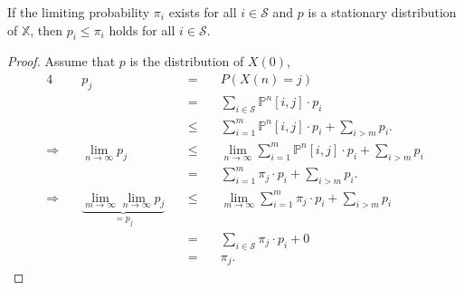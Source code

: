 \begin{inequality} \label{ineq:p-le-pi}
If the limiting probability $ \pi_{i} $ exists for all $ i \in \mathcal{S} $ and $ p $ is a stationary distribution of $ \mathbb{X} $, then $ p_{i} \le \pi_{i} $ holds for all $ i \in \mathcal{S} $.

\begin{proof}
Assume that $ p $ is the distribution of $ X(0) $,
\begin{alignat*}{4}
  & p_{j}
    & \quad=\quad & P(X(n) = j) \\
  & & \quad=\quad & \sum_{i \in \mathcal{S}} \mathbb{P}^{n}[i, j] \cdot p_{i} \\
  & & \quad\le\quad & \sum_{i = 1}^{m} \mathbb{P}^{n}[i, j] \cdot p_{i} + \sum_{i > m} p_{i}. \\
\Rightarrow\quad
  & \lim_{n \to \infty} p_{j}
    & \quad\le\quad & \lim_{n \to \infty} \sum_{i = 1}^{m} \mathbb{P}^{n}[i, j] \cdot p_{i} + \sum_{i > m} p_{i} \\
  & & \quad=\quad & \sum_{i = 1}^{m} \pi_{j} \cdot p_{i} + \sum_{i > m} p_{i}. \\
\Rightarrow\quad
  & \underbrace{\lim_{m \to \infty} \lim_{n \to \infty} p_{j}}_{= p_{j}}
    & \quad\le\quad & \lim_{m \to \infty} \sum_{i = 1}^{m} \pi_{j} \cdot p_{i} + \sum_{i > m} p_{i} \\
  & & \quad=\quad & \sum_{i \in \mathcal{S}} \pi_{j} \cdot p_{i} + 0 \\
  & & \quad=\quad & \pi_{j}.
\end{alignat*}
\end{proof}
\end{inequality}

